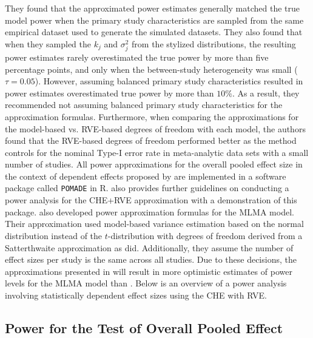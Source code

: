 They found that the approximated power estimates generally matched the true model power when the primary study characteristics are sampled from the same empirical dataset used to generate the simulated datasets. They also found that when they sampled the $k_j$ and $\sigma_j^2$ from the stylized distributions, the resulting power estimates rarely overestimated the true power by more than five percentage points, and only when the between-study heterogeneity was small ($\tau = 0.05$). However, assuming balanced primary study characteristics resulted in power estimates overestimated true power by more than $10\%$. As a result, they recommended not assuming balanced primary study characteristics for the approximation formulas. Furthermore, when comparing the approximations for the model-based vs. RVE-based degrees of freedom with each model, the authors found that the RVE-based degrees of freedom performed better as the method controls for the nominal Type-I error rate in meta-analytic data sets with a small number of studies. All power approximations for the overall pooled effect size in the context of dependent effects proposed by \textcite{vembye2023} are implemented in a software package called \texttt{POMADE} in R. \textcite{vembye2024} also provides further guidelines on conducting a power analysis for the CHE+RVE approximation with a demonstration of this package.        
\textcite{zhang2024} also developed power approximation formulas for the MLMA model. Their approximation used model-based variance estimation based on the normal distribution instead of the $t$-distribution with degrees of freedom derived from a Satterthwaite approximation as \textcite{vembye2023} did. Additionally, they assume the number of effect sizes per study is the same across all studies. Due to these decisions, the approximations presented in \textcite{zhang2024} will result in more optimistic estimates of power levels for the MLMA model than \textcite{vembye2023} \autocite{vembye2024}. Below is an overview of a power analysis involving statistically dependent effect sizes using the CHE with RVE.

\subsection{Power for the Test of Overall Pooled Effect}

